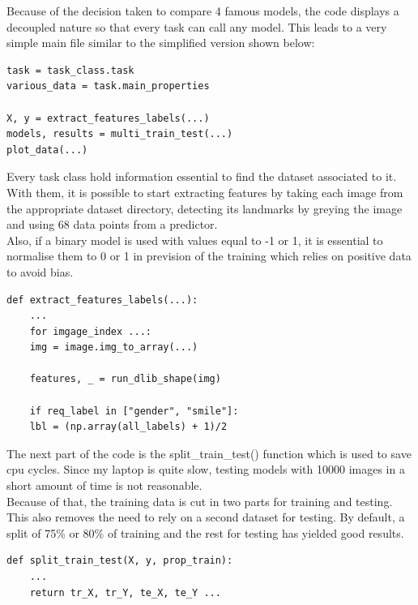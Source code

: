 \documentclass[a4paper,12pt,twoside,twocolumn]{article}
\begin{document}
Because of the decision taken to compare 4 famous models, the code displays a decoupled nature so that every task can call any model. This leads to a very simple main file similar to the simplified version shown below:\\

\lstset{language=Python,label= ,caption= ,captionpos=b,numbers=none}
\begin{lstlisting}
task = task_class.task
various_data = task.main_properties

X, y = extract_features_labels(...)
models, results = multi_train_test(...)
plot_data(...)
\end{lstlisting}

Every task class hold information essential to find the dataset associated to it. With them, it is possible to start extracting features by taking each image from the appropriate dataset directory, detecting its landmarks by greying the image and using 68 data points from a predictor.\\

Also, if a binary model is used with values equal to -1 or 1, it is essential to normalise them to 0 or 1 in prevision of the training which relies on positive data to avoid bias.\\

\lstset{language=Python,label= ,caption= ,captionpos=b,numbers=none}
\begin{lstlisting}
def extract_features_labels(...):
    ...
    for imgage_index ...:
	img = image.img_to_array(...)

    features, _ = run_dlib_shape(img)

    if req_label in ["gender", "smile"]: 
	lbl = (np.array(all_labels) + 1)/2
\end{lstlisting}

The next part of the code is the split\_train\_test() function which is used to save cpu cycles. Since my laptop is quite slow, testing models with 10000 images in a short amount of time is not reasonable.\\

Because of that, the training data is cut in two parts for training and testing. This also removes the need to rely on a second dataset for testing. By default, a split of 75\% or 80\% of training and the rest for testing has yielded good results.\\

\lstset{language=Python,label= ,caption= ,captionpos=b,numbers=none}
\begin{lstlisting}
def split_train_test(X, y, prop_train):
    ...
    return tr_X, tr_Y, te_X, te_Y ...
\end{lstlisting}
\end{document}
